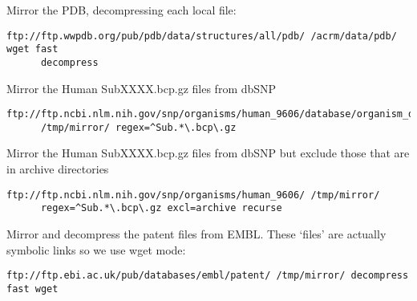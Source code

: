 \documentclass{article}
\begin{document}
\noindent Mirror the PDB, decompressing each local file:
{\footnotesize
\begin{verbatim}
ftp://ftp.wwpdb.org/pub/pdb/data/structures/all/pdb/ /acrm/data/pdb/ wget fast 
      decompress
\end{verbatim}
}
\vspace{1em}

\noindent Mirror the Human SubXXXX.bcp.gz files from dbSNP
{\footnotesize
\begin{verbatim}
ftp://ftp.ncbi.nlm.nih.gov/snp/organisms/human_9606/database/organism_data/ 
      /tmp/mirror/ regex=^Sub.*\.bcp\.gz
\end{verbatim}
}
\vspace{1em}

\noindent Mirror the Human SubXXXX.bcp.gz files from dbSNP but exclude
those that are in archive directories
{\footnotesize
\begin{verbatim}
ftp://ftp.ncbi.nlm.nih.gov/snp/organisms/human_9606/ /tmp/mirror/ 
      regex=^Sub.*\.bcp\.gz excl=archive recurse
\end{verbatim}
}

\noindent Mirror and decompress the patent files from EMBL. These
`files' are actually symbolic links so we use wget mode:
{\footnotesize
\begin{verbatim}
ftp://ftp.ebi.ac.uk/pub/databases/embl/patent/ /tmp/mirror/ decompress fast wget
\end{verbatim}
}
\end{document}
